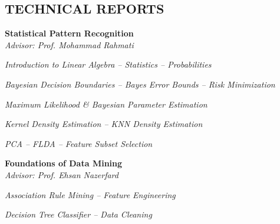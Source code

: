 \documentclass[margin, 10pt]{res} %
\begin{document}
\begin{resume}
     
    \section{TECHNICAL REPORTS}
        \textbf{Statistical Pattern Recognition}\\
		\textit{Advisor: Prof. Mohammad Rahmati}
		\begin{innerlist}
			\item \textit{Introduction to Linear Algebra -- Statistics -- Probabilities} \href{https://github.com/aligholamee/Patterns/raw/master/docs/assignment-1/SPR_9531504_HW1.pdf}{\hfill\UrlFont[docs]}
			
			\item \textit{Bayesian Decision Boundaries -- Bayes Error Bounds -- Risk Minimization} \href{https://github.com/aligholamee/Patterns/raw/master/docs/assignment-2/SPR_9531504_HW2.pdf}{\hfill\UrlFont[docs]}

			\item \textit{Maximum Likelihood \& Bayesian Parameter Estimation} \href{https://github.com/aligholamee/Patterns/raw/master/docs/assignment-3/SPR_9531504_HW3.pdf}{\hfill\UrlFont[docs]}
			
			
			\item \textit{Kernel Density Estimation -- KNN Density Estimation} \href{https://github.com/aligholamee/Patterns/raw/master/docs/assignment-4/SPR_9531504_HW4.pdf}{\hfill\UrlFont[docs]}
			
			\item \textit{PCA -- FLDA -- Feature Subset Selection} \href{https://github.com/aligholamee/Patterns/raw/master/docs/assignment-5/SPR_9531504_HW5.pdf}{\hfill\UrlFont[docs]}
		\end{innerlist}

        \textbf{Foundations of Data Mining}\\
		\textit{Advisor: Prof. Ehsan Nazerfard}
		\begin{innerlist}
			\item \textit{Association Rule Mining -- Feature Engineering} \href{https://github.com/aligholamee/Datadigger/raw/master/docs/assignment-1/report/DM_9531504_HW1.pdf}{\hfill\UrlFont[docs]}
			
			\item \textit{Decision Tree Classifier -- Data Cleaning} \href{https://github.com/aligholamee/Datadigger/raw/master/docs/assignment-2/report/DM_9531504_HW2.pdf}{\hfill\UrlFont[docs]}
			

\end{innerlist}
\end{resume}
\end{document}

